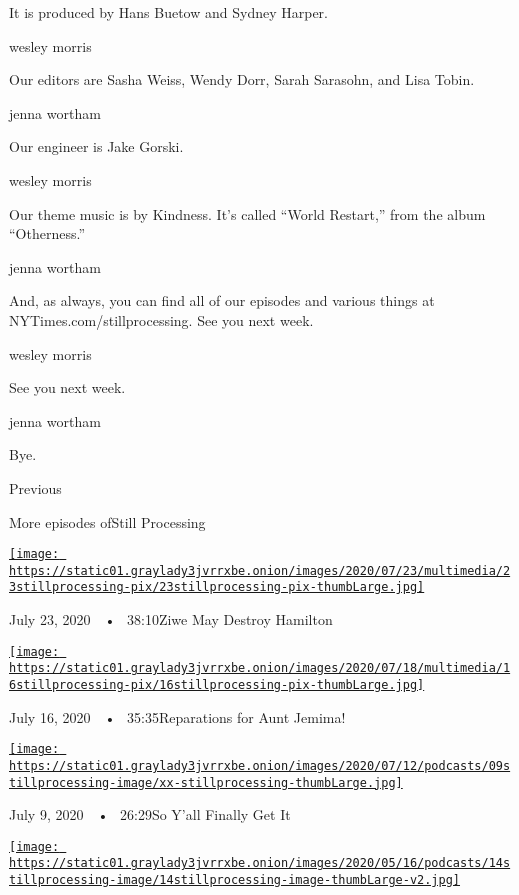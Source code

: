 It is produced by Hans Buetow and Sydney Harper.

wesley morris

Our editors are Sasha Weiss, Wendy Dorr, Sarah Sarasohn, and Lisa Tobin.

jenna wortham

Our engineer is Jake Gorski.

wesley morris

Our theme music is by Kindness. It's called ``World Restart,'' from the
album ``Otherness.''

jenna wortham

And, as always, you can find all of our episodes and various things at
NYTimes.com/stillprocessing. See you next week.

wesley morris

See you next week.

jenna wortham

Bye.

Previous

More episodes ofStill Processing

\href{https://www.nytimes3xbfgragh.onion/2020/07/23/podcasts/hamilton-ziwe-discomfort.html?action=click\&module=audio-series-bar\&region=header\&pgtype=Article}{\texttt{[image: https://static01.graylady3jvrrxbe.onion/images/2020/07/23/multimedia/23stillprocessing-pix/23stillprocessing-pix-thumbLarge.jpg]}}

July 23, 2020~~•~ 38:10Ziwe May Destroy Hamilton

\href{https://www.nytimes3xbfgragh.onion/2020/07/16/podcasts/reparations-for-aunt-jemima.html?action=click\&module=audio-series-bar\&region=header\&pgtype=Article}{\texttt{[image: https://static01.graylady3jvrrxbe.onion/images/2020/07/18/multimedia/16stillprocessing-pix/16stillprocessing-pix-thumbLarge.jpg]}}

July 16, 2020~~•~ 35:35Reparations for Aunt Jemima!

\href{https://www.nytimes3xbfgragh.onion/2020/07/09/podcasts/still-processing-black-lives-matter.html?action=click\&module=audio-series-bar\&region=header\&pgtype=Article}{\texttt{[image: https://static01.graylady3jvrrxbe.onion/images/2020/07/12/podcasts/09stillprocessing-image/xx-stillprocessing-thumbLarge.jpg]}}

July 9, 2020~~•~ 26:29So Y'all Finally Get It

\href{https://www.nytimes3xbfgragh.onion/2020/05/14/podcasts/still-processing-westworld-hollywood-utopia-dystopia.html?action=click\&module=audio-series-bar\&region=header\&pgtype=Article}{\texttt{[image: https://static01.graylady3jvrrxbe.onion/images/2020/05/16/podcasts/14stillprocessing-image/14stillprocessing-image-thumbLarge-v2.jpg]}}

